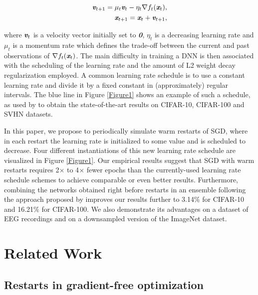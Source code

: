\documentclass{article} %
\newcommand{\vc}[1]{\textit{\textbf{#1}}}
\begin{document}
\begin{eqnarray}
	\vc{v}_{t+1} = \mu_t \vc{v}_t  - \eta_t \nabla f_t(\vc{x}_t), \label{eq:moms1} \\
	\vc{x}_{t+1} = \vc{x}_t + \vc{v}_{t+1}, \label{eq:moms2}
\end{eqnarray}

where $\vc{v}_t$ is a velocity vector initially set to \vc{0}, $\eta_t$ is a decreasing learning rate and $\mu_t$ is a momentum rate which defines the trade-off between the current and past observations of $\nabla f_t(\vc{x}_t)$. 
The main difficulty in training a DNN is then associated with the scheduling of the learning rate and the amount of L2 weight decay regularization employed. A common learning rate schedule is to use a constant learning rate and divide it by a fixed constant in (approximately) regular intervals. The blue line in Figure \ref{Figure1} shows an example of such a schedule, as used by \cite{zagoruyko2016wide} to obtain the state-of-the-art results on CIFAR-10, CIFAR-100 and SVHN datasets. 

In this paper, we propose to periodically simulate warm restarts of SGD, where in each restart the learning rate is initialized to some value and is scheduled to decrease. Four different instantiations of this new learning rate schedule are visualized in Figure \ref{Figure1}. Our empirical results suggest that SGD with warm restarts requires 2$\times$ to 4$\times$ fewer epochs than the currently-used learning rate schedule schemes to achieve comparable or even better results. Furthermore, combining the networks obtained right before restarts in an ensemble following the approach proposed by \cite{SnapshotICLR2017} improves our results further to 3.14\% for CIFAR-10 and 16.21\% for CIFAR-100. We also demonstrate its advantages on a dataset of EEG recordings and on a downsampled version of the ImageNet dataset.


\section{Related Work}

\subsection{Restarts in gradient-free optimization}
\end{document}
